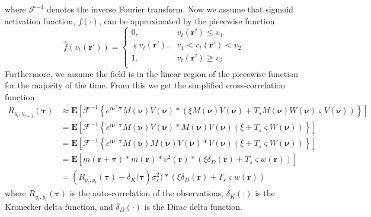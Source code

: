 \documentclass[review,authoryear,3p]{elsarticle}
\begin{document}
where $\mathcal{F}^{-1}$ denotes the inverse Fourier transform. Now we assume that sigmoid activation function, $f(\cdot)$, can be approximated by the piecewise function
\begin{equation}
	\hat{f}(v_t(\mathbf{r}')) = \left\{ \begin{array}{ll}
		0, & v_t(\mathbf{r}') \le v_1 \\
		\varsigma v_t(\mathbf{r}'), &  v_1 < v_t(\mathbf{r}') < v_2 \\
		1, & v_t(\mathbf{r}') \ge v_2 \\ 
		\end{array}\right.
\end{equation}
Furthermore, we assume the field is in the linear region of the piecewise function for the majority of the time. From this we get the simplified cross-correlation function
\begin{align}
	R_{y_{t},y_{t+1}}(\boldsymbol{\tau}) &\approx \mathbf{E}\left[\mathcal{F}^{-1} \left\{e^{i\boldsymbol{\nu}^{\top}\boldsymbol{\tau}} M(\boldsymbol{\nu}) V(\boldsymbol{\nu}) \ast \left(\xi M(\boldsymbol{\nu})V(\boldsymbol{\nu}) + T_s M(\boldsymbol{\nu}) W(\boldsymbol{\nu}) \varsigma V(\boldsymbol{\nu}) \right) \right\} \right] \\
	&= \mathbf{E}\left[\mathcal{F}^{-1} \left\{e^{i\boldsymbol{\nu}^{\top}\boldsymbol{\tau}} M(\boldsymbol{\nu}) V(\boldsymbol{\nu}) \ast M(\boldsymbol{\nu})V(\boldsymbol{\nu}) \left(\xi  + T_s \varsigma W(\boldsymbol{\nu})  \right) \right\} \right] \\
	&= \mathbf{E}\left[\mathcal{F}^{-1} \left\{e^{i\boldsymbol{\nu}^{\top}\boldsymbol{\tau}} M(\boldsymbol{\nu}) M(\boldsymbol{\nu}) V(\boldsymbol{\nu}) \ast V(\boldsymbol{\nu}) \left(\xi  + T_s \varsigma W(\boldsymbol{\nu}) \right) \right\} \right] \\
	&= \mathbf{E}\left[m(\mathbf{r} + \boldsymbol{\tau}) \ast m(\mathbf{r}) \ast v^2(\mathbf{r}) \ast \left(\xi\delta_D(\mathbf{r})  + T_s \varsigma w(\mathbf{r})\right) \right] \\
	&= \left(R_{y_t,y_t}(\boldsymbol{\tau}) - \delta_K(\boldsymbol{\tau}\right)\sigma_{\varepsilon}^2) \ast \left(\xi\delta_D(\mathbf{r})  + T_s \varsigma w(\mathbf{r})\right) \label{eq:xcorr_with_autocorr}
\end{align}
where $R_{y_{t},y_{t}}(\boldsymbol{\tau})$ is the auto-correlation of the observations, $\delta_K(\cdot)$ is the Kronecker delta function, and $\delta_D(\cdot)$ is the Dirac delta function.
\end{document}
